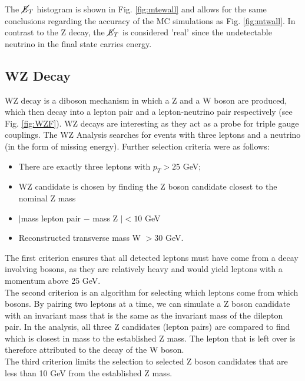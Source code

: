 \documentclass[runningheads,a4paper]{llncs}
\begin{document}
The $\cancel{\it{E}}_{T}$ histogram is shown in Fig. \ref{fig:mtewall} and allows for the same conclusions regarding the accuracy of the MC simulations as Fig. \ref{fig:mtwall}. In contrast to the Z decay, the $\cancel{\it{E}}_{T}$ is considered 'real' since the undetectable neutrino in the final state carries energy.\\


\pagebreak
\subsection{WZ Decay}

WZ decay is a diboson mechanism in which a Z and a W boson are produced, which then decay into a lepton pair and a lepton-neutrino pair respectively (see Fig. \ref{fig:WZF}). WZ decays are interesting as they act as a probe for triple gauge couplings. The WZ Analysis searches for events with three leptons and a neutrino (in the form of missing energy). Further selection criteria were as follows: \\

\begin{itemize}
\item There are exactly three leptons with ${p}_{T} > 25$ GeV;
\item WZ candidate is chosen by finding the Z boson candidate closest to the nominal Z
mass
\item $|$mass lepton pair $-$ mass Z $|$$ < 10$ GeV
\item Reconstructed transverse mass W $> 30$ GeV.
\end{itemize}

The first criterion ensures that all detected leptons must have come from a decay involving bosons, as they are relatively heavy and would yield leptons with a momentum above 25 GeV.\\

The second criterion is an algorithm for selecting which leptons come from which bosons. By pairing two leptons at a time, we can simulate a Z boson candidate with an invariant mass that is the same as the invariant mass of the dilepton pair. In the analysis, all three Z candidates (lepton pairs) are compared to find which is closest in mass to the established Z mass. The lepton that is left over is therefore attributed to the decay of the W boson.\\

The third criterion limits the selection to selected Z boson candidates that are less than 10 GeV from the established Z mass.\\
\end{document}
